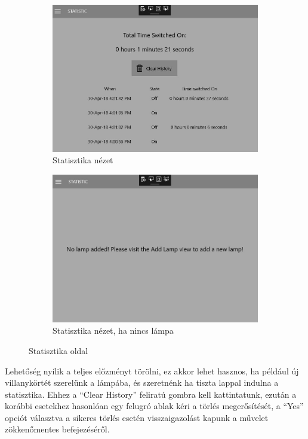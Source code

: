 \documentclass[a4paper,12pt]{report}
\begin{document}
    \begin{figure}[H]
        \centering
        \begin{subfigure}[b]{0.4\linewidth}
            \includegraphics[width=\linewidth]{images/statisticview.jpg}
            \caption{Statisztika nézet}
        \end{subfigure}
        \begin{subfigure}[b]{0.4\linewidth}
            \includegraphics[width=\linewidth]{images/statisticnolamp.jpg}
            \caption{Statisztika nézet, ha nincs lámpa}
        \end{subfigure}
        \caption{Statisztika oldal}
        \label{fig:Statistic}
    \end{figure}

    Lehetőség nyílik a teljes előzményt törölni, ez akkor lehet hasznos, ha például új villanykörtét szerelünk a lámpába,
    és szeretnénk ha tiszta lappal indulna a statisztika. Ehhez a ``Clear History'' feliratú gombra kell kattintatunk, ezután
    a korábbi esetekhez hasonlóan egy felugró ablak kéri a törlés megerősítését, a ``Yes'' opciót választva a sikeres törlés
    esetén visszaigazolást kapunk a művelet zökkenőmentes befejezéséről.
\end{document}
